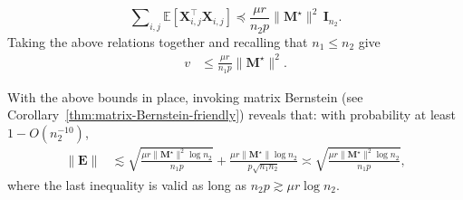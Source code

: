 %
\[
	\sum\nolimits _{i,j}\mathbb{E}\left[\bm{X}_{i,j}^{\top}\bm{X}_{i,j}\right] \preceq \frac{\mu r}{n_2p} \|\bm{M}^{\star}\|^{2} \,\bm{I}_{n_2}.
\]
%
Taking the above  relations together and recalling that $n_1\leq n_2$ give
%
\begin{align*}
v & %
	\leq\frac{\mu r}{n_{1}p} \big\| \bm{M}^{\star} \big\|^2.
\end{align*}
% 


With the above bounds in place, invoking matrix Bernstein (see Corollary~\ref{thm:matrix-Bernstein-friendly}) reveals that: with probability at least $1-O(n_2^{-10})$,
%
\begin{align*}
	\| \bm{E}\| & \lesssim \sqrt{\frac{\mu r \| \bm{M}^{\star} \|^2 \log n_{2}}{n_{1}p} }+\frac{\mu r \| \bm{M}^{\star} \| \log n_{2}}{p\sqrt{n_{1}n_{2}}}
	\asymp \sqrt{\frac{\mu r \| \bm{M}^{\star} \|^2 \log n_{2}}{n_{1}p} } ,
\end{align*}
%
where the last inequality is valid as long as  $n_{2}p \gtrsim \mu r\log n_{2}$.




